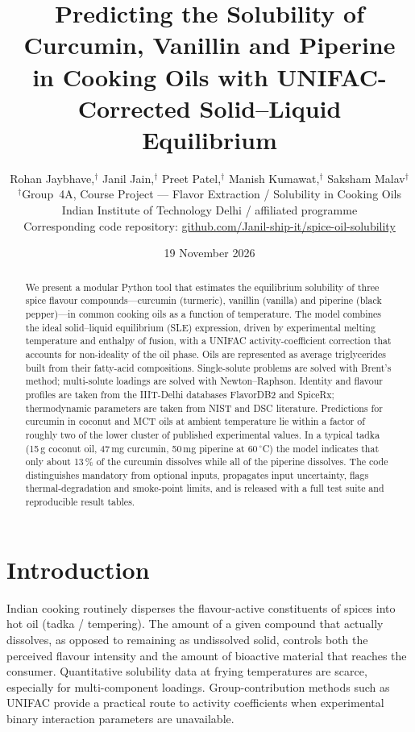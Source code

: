 \documentclass[twocolumn,10pt]{article}
\title{\textbf{Predicting the Solubility of Curcumin, Vanillin and Piperine\\
in Cooking Oils with UNIFAC-Corrected Solid--Liquid Equilibrium}}
\author{
Rohan Jaybhave,$^{\dagger}$
Janil Jain,$^{\dagger}$
Preet Patel,$^{\dagger}$
Manish Kumawat,$^{\dagger}$
Saksham Malav$^{\dagger}$\\[0.4em]
\small $^{\dagger}$Group~4A, Course Project --- Flavor Extraction / Solubility in Cooking Oils\\
\small Indian Institute of Technology Delhi / affiliated programme\\[0.3em]
\small Corresponding code repository:
\href{https://github.com/Janil-ship-it/spice-oil-solubility}{github.com/Janil-ship-it/spice-oil-solubility}
}
\date{19 November 2026}
\begin{document}
\maketitle

\begin{abstract}
\noindent
We present a modular Python tool that estimates the equilibrium solubility of three spice flavour compounds---curcumin (turmeric), vanillin (vanilla) and piperine (black pepper)---in common cooking oils as a function of temperature. The model combines the ideal solid--liquid equilibrium (SLE) expression, driven by experimental melting temperature and enthalpy of fusion, with a UNIFAC activity-coefficient correction that accounts for non-ideality of the oil phase. Oils are represented as average triglycerides built from their fatty-acid compositions. Single-solute problems are solved with Brent's method; multi-solute loadings are solved with Newton--Raphson. Identity and flavour profiles are taken from the IIIT-Delhi databases FlavorDB2 and SpiceRx; thermodynamic parameters are taken from NIST and DSC literature. Predictions for curcumin in coconut and MCT oils at ambient temperature lie within a factor of roughly two of the lower cluster of published experimental values. In a typical tadka (15\,g coconut oil, 47\,mg curcumin, 50\,mg piperine at 60\,$^\circ$C) the model indicates that only about 13\,\% of the curcumin dissolves while all of the piperine dissolves. The code distinguishes mandatory from optional inputs, propagates input uncertainty, flags thermal-degradation and smoke-point limits, and is released with a full test suite and reproducible result tables.
\end{abstract}

\section{Introduction}

Indian cooking routinely disperses the flavour-active constituents of spices into hot oil (tadka / tempering). The amount of a given compound that actually dissolves, as opposed to remaining as undissolved solid, controls both the perceived flavour intensity and the amount of bioactive material that reaches the consumer. Quantitative solubility data at frying temperatures are scarce, especially for multi-component loadings. Group-contribution methods such as UNIFAC provide a practical route to activity coefficients when experimental binary interaction parameters are unavailable.
\end{document}
